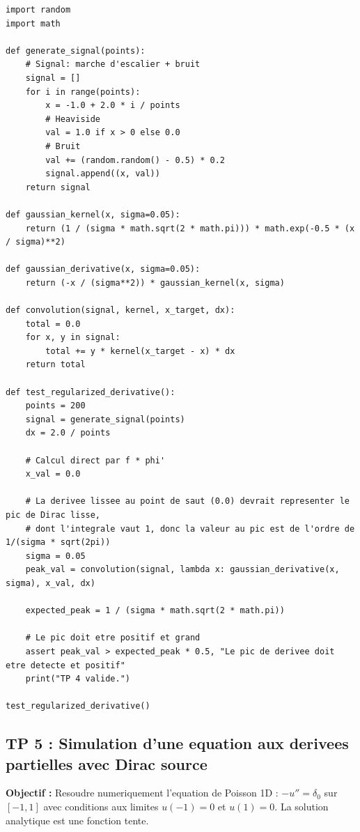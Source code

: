 \documentclass[11pt,a4paper]{article}
\begin{document}
\begin{lstlisting}
import random
import math

def generate_signal(points):
    # Signal: marche d'escalier + bruit
    signal = []
    for i in range(points):
        x = -1.0 + 2.0 * i / points
        # Heaviside
        val = 1.0 if x > 0 else 0.0
        # Bruit
        val += (random.random() - 0.5) * 0.2
        signal.append((x, val))
    return signal

def gaussian_kernel(x, sigma=0.05):
    return (1 / (sigma * math.sqrt(2 * math.pi))) * math.exp(-0.5 * (x / sigma)**2)

def gaussian_derivative(x, sigma=0.05):
    return (-x / (sigma**2)) * gaussian_kernel(x, sigma)

def convolution(signal, kernel, x_target, dx):
    total = 0.0
    for x, y in signal:
        total += y * kernel(x_target - x) * dx
    return total

def test_regularized_derivative():
    points = 200
    signal = generate_signal(points)
    dx = 2.0 / points

    # Calcul direct par f * phi'
    x_val = 0.0

    # La derivee lissee au point de saut (0.0) devrait representer le pic de Dirac lisse,
    # dont l'integrale vaut 1, donc la valeur au pic est de l'ordre de 1/(sigma * sqrt(2pi))
    sigma = 0.05
    peak_val = convolution(signal, lambda x: gaussian_derivative(x, sigma), x_val, dx)

    expected_peak = 1 / (sigma * math.sqrt(2 * math.pi))

    # Le pic doit etre positif et grand
    assert peak_val > expected_peak * 0.5, "Le pic de derivee doit etre detecte et positif"
    print("TP 4 valide.")

test_regularized_derivative()
\end{lstlisting}

\subsection*{TP 5 : Simulation d'une equation aux derivees partielles avec Dirac source }
\textbf{Objectif :} Resoudre numeriquement l'equation de Poisson 1D : $-u'' = \delta_0$ sur $[-1, 1]$ avec conditions aux limites $u(-1) = 0$ et $u(1) = 0$. La solution analytique est une fonction tente.
\end{document}
